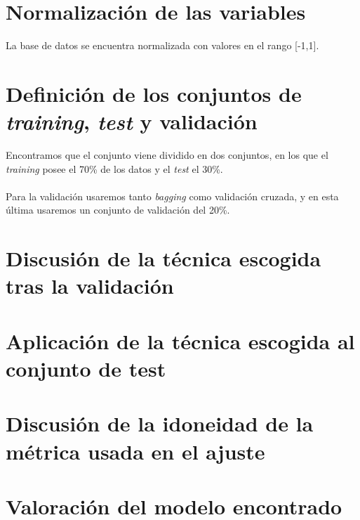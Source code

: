 \documentclass[a4paper,openright,12pt]{article}
\begin{document}
\section{Normalización de las variables}
La base de datos se encuentra normalizada con valores en el rango [-1,1].

\section{Definición de los conjuntos de \textit{training}, \textit{test} y validación}
Encontramos que el conjunto viene dividido en dos conjuntos, en los que el \textit{training} posee el 70\% de los datos y el \textit{test} el 30\%.\\\\
Para la validación usaremos tanto \textit{bagging} como validación cruzada, y en esta última usaremos un conjunto de validación del 20\%.

\section{Discusión de la técnica escogida tras la validación}

\section{Aplicación de la técnica escogida al conjunto de test}

\section{Discusión de la idoneidad de la métrica usada en el ajuste}

\section{Valoración del modelo encontrado}
\end{document}
